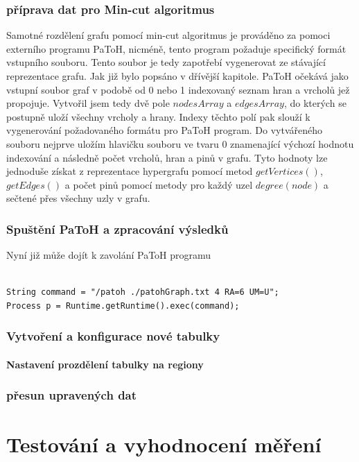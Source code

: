 \documentclass[thesis=M,czech]{FITthesis}[2012/06/26]
\begin{document}
\subsection{příprava dat pro Min-cut algoritmus}
Samotné rozdělení grafu pomocí min-cut algoritmus je prováděno za pomoci externího programu PaToH, nicméně, tento program požaduje specifický formát vstupního souboru. Tento soubor je tedy zapotřebí vygenerovat ze stávající reprezentace grafu. Jak již bylo popsáno v dřívější kapitole. PaToH očekává jako vstupní soubor graf v podobě od 0 nebo 1 indexovaný seznam hran a vrcholů jež propojuje.  Vytvořil jsem tedy dvě pole $nodesArray$ a $edgesArray$, do kterých se postupně uloží všechny vrcholy a hrany. Indexy těchto polí pak slouží k vygenerování požadovaného formátu pro PaToH program. Do vytvářeného souboru nejprve uložím hlavičku souboru ve tvaru 0 znamenající výchozí hodnotu indexování a následně počet vrcholů, hran a pinů v grafu. Tyto hodnoty lze jednoduše získat z reprezentace hypergrafu pomocí metod $getVertices()$, $getEdges()$ a počet pinů pomocí metody pro každý uzel $degree(node)$ a sečtené přes všechny uzly v grafu.


\subsection{Spuštění PaToH a zpracování výsledků}
Nyní již může dojít k zavolání PaToH programu
\begin{lstlisting}[frame=single]  % Start your code-block

String command = "/patoh ./patohGraph.txt 4 RA=6 UM=U";
Process p = Runtime.getRuntime().exec(command);
\end{lstlisting}

\subsection{Vytvoření a konfigurace nové tabulky}
\subsubsection{Nastavení prozdělení tabulky na regiony}
\subsection{přesun upravených dat}


\chapter{Testování a vyhodnocení měření}
\end{document}
